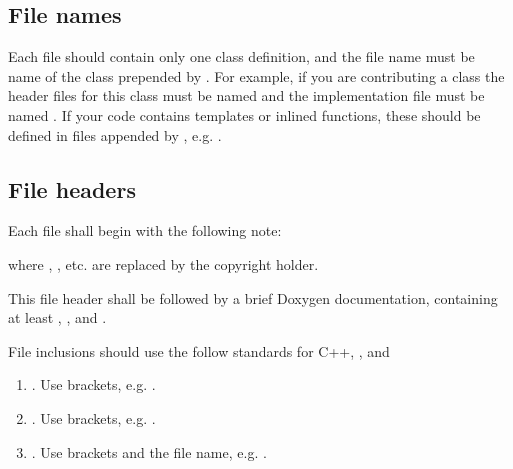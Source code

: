 \documentclass[letterpaper,10pt,english]{sphinxmanual}
\begin{document}
\subsection{File names}
\label{\detokenize{Contrib/CodeStandard:file-names}}
Each file should contain only one class definition, and the file name must be name of the class prepended by .
For example, if you are contributing a class  the header files for this class must be named  and the implementation file must be named .
If your code contains templates or inlined functions, these should be defined in files appended by , e.g. .


\subsection{File headers}
\label{\detokenize{Contrib/CodeStandard:file-headers}}
Each file shall begin with the following note:

\begin{sphinxVerbatim}[commandchars=\\\{\},formatcom=\scriptsize]
\end{sphinxVerbatim}

where , , etc. are replaced by the copyright holder.

This file header shall be followed by a brief Doxygen documentation, containing at least , , and .

File inclusions should use the follow standards for C++, , and 
\begin{enumerate}
%
\item {} 
. Use brackets, e.g. .

\item {} 
. Use brackets, e.g. .

\item {} 
. Use brackets and the file name, e.g. .

\end{enumerate}
\end{document}
